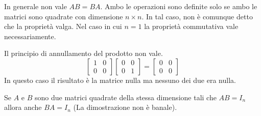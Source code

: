 \documentclass[a4paper]{article}
\begin{document}


In generale non vale \(AB=BA\). Ambo le operazioni sono definite solo se ambo le matrici sono quadrate
con dimensione \(n\times n\). In tal caso, non è comunque detto che la proprietà valga.
Nel caso in cui \(n=1\) la proprietà commutativa vale necessariamente.

Il principio di annullamento del prodotto non vale.
\[
    \begin{bmatrix}
        1 & 0 \\
        0 & 0
    \end{bmatrix}
    \begin{bmatrix}
        0 & 0 \\
        0 & 1
    \end{bmatrix}
    =
    \begin{bmatrix}
        0 & 0 \\
        0 & 0
    \end{bmatrix}
\]
In questo caso il risultato è la matrice nulla ma nessuno dei due era nulla.



Se \(A\) e \(B\) sono due matrici quadrate della stessa dimensione
tali che \(AB = I_n\) allora anche \(BA = I_n\) (La dimostrazione non è banale).
\end{document}
